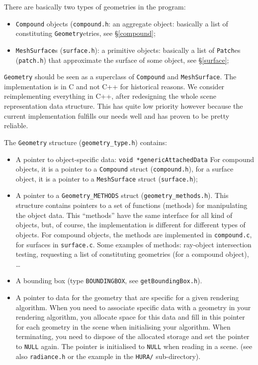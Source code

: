 \documentclass[11pt]{report}
\begin{document}
There are basically two types of geometries in the program:
\begin{itemize}
\item   {\tt Compound} objects ({\tt compound.h}: an aggregate object:
  basically a list of constituting {\tt Geometry}etries, see \S\ref{compound};
\item   {\tt MeshSurface}s ({\tt surface.h}): a primitive objects: basically
  a list of {\tt Patch}es ({\tt patch.h}) that approximate the
  surface of some object, see \S\ref{surface};
\end{itemize}
{\tt Geometry} should be seen as a superclass of {\tt Compound} and {\tt MeshSurface}.
The implementation is in C and not C++ for historical reasons. We consider
reimplementing everything in C++, after redesigning the whole scene
representation data structure. This has quite low priority however
because the current implementation fulfills our needs well and has
proven to be pretty reliable.

The {\tt Geometry} structure ({\tt geometry\_type.h}) contains:
\begin{itemize}
\item   A pointer to object-specific data:
        \newline
        {\tt void *genericAttachedData}
        \newline
        For compound objects, it is a pointer to a {\tt Compound}
        struct ({\tt compound.h}), for a surface object, it is a pointer
        to a {\tt MeshSurface} struct ({\tt surface.h});
\item   A pointer to a {\tt Geometry\_METHODS} struct ({\tt geometry\_methods.h}).
  This structure contains pointers to a set of functions (methods) for 
  manipulating the object data. This ``methods'' have the same interface for
  all kind of objects, but, of course, the implementation is different for 
  different types of objects. For compound objects, the methods are
  implemented in {\tt compound.c}, for surfaces in {\tt surface.c}.
  Some examples of methods: ray-object intersection testing, requesting
  a list of constituting geometries (for a compound object), \ldots
\item   A bounding box (type {\tt BOUNDINGBOX}, see {\tt getBoundingBox.h}).
\item   A pointer to data for the geometry that are specific for a given
  rendering algorithm. When you need to associate specific data with a 
  geometry in your rendering algorithm, you allocate space for this data
  and fill in this pointer for each geometry in the scene when initialising
  your algorithm. When terminating, you need to dispose of the allocated
  storage and set the pointer to {\tt NULL} again. The pointer is initialised
  to {\tt NULL} when reading in a scene. (see also {\tt radiance.h} or
  the example in the {\tt HURA/} sub-directory).
\end{itemize}
\end{document}
